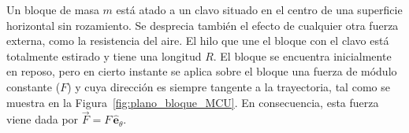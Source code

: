 \documentclass[addpoints]{exam}
\newcommand{\ver}[1]{\hat{\mathbf{#1}}}
\begin{document}
\begin{questions}
    \question \label{ej:bloque_plano_MCU} Un bloque de masa $m$ está atado a un clavo situado en el centro de una superficie horizontal sin rozamiento. Se desprecia también el efecto de cualquier otra fuerza externa, como la resistencia del aire. El hilo que une el bloque con el clavo está totalmente estirado y tiene una longitud $R$. El bloque se encuentra inicialmente en reposo, pero en cierto instante se aplica sobre el bloque una fuerza de módulo constante ($F$) y cuya dirección es siempre tangente a la trayectoria, tal como se muestra en la Figura~\ref{fig:plano_bloque_MCU}. En consecuencia, esta fuerza viene dada por $\vec{F} = F \, \ver{e}_\theta $. \label{ej:plano_bloque_MCU}
    
    \begin{minipage}[c]{0.4\textwidth}
\end{minipage}
\end{questions}
\end{document}
